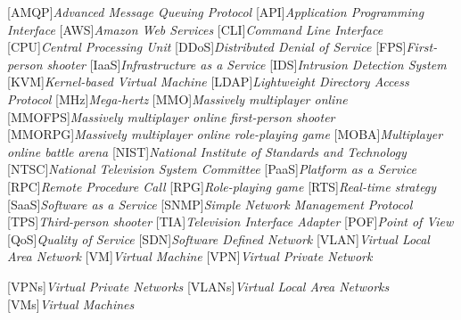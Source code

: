 \begin{acronym}[]
	[AMQP]{{\it Advanced Message Queuing Protocol}}
	[API]{{\it Application Programming Interface}}
  [AWS]{{\it Amazon Web Services}}
	[CLI]{{\it Command Line Interface}}
	[CPU]{{\it Central Processing Unit}}
	[DDoS]{{\it Distributed Denial of Service}}
	[FPS]{{\it First-person shooter}}
	[IaaS]{{\it Infrastructure as a Service}}
  [IDS]{{\it Intrusion Detection System}}
	[KVM]{{\it Kernel-based Virtual Machine}}
  [LDAP]{{\it Lightweight Directory Access Protocol}}
	[MHz]{{\it Mega-hertz}}
	[MMO]{{\it Massively multiplayer online}}
	[MMOFPS]{{\it Massively multiplayer online first-person shooter}}
	[MMORPG]{{\it Massively multiplayer online role-playing game}}
	[MOBA]{{\it Multiplayer online battle arena}}
	[NIST]{{\it National Institute of Standards and Technology}}
	[NTSC]{{\it National Television System Committee}}
	[PaaS]{{\it Platform as a Service}}
  [RPC]{{\it Remote Procedure Call}}
	[RPG]{{\it Role-playing game}}
	[RTS]{{\it Real-time strategy}}
	[SaaS]{{\it Software as a Service}}
	[SNMP]{{\it Simple Network Management Protocol}}
	[TPS]{{\it Third-person shooter}}
	[TIA]{{\it Television Interface Adapter}}
	[POF]{{\it Point of View}}
	[QoS]{{\it Quality of Service}}
	[SDN]{{\it Software Defined Network}}
	[VLAN]{{\it Virtual Local Area Network}}
	[VM]{{\it Virtual Machine}}
	[VPN]{{\it Virtual Private Network}}



	[VPNs]{{\it Virtual Private Networks}}
	[VLANs]{{\it Virtual Local Area Networks}}
	[VMs]{{\it Virtual Machines}}
\end{acronym}

